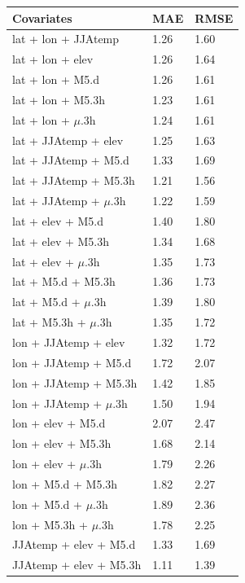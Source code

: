 \documentclass[12pt,a4paper,english]{article}
\begin{document}
\begin{singlespace}
\begin{table}
\begin{minipage}[b]{0.33\linewidth}
  \begin{tabular}{|l|l|l|}
    \hline
    \hline
    \textbf{Covariates}& \textbf{MAE} & \textbf{RMSE} \\
	\hline
	\hline
	lat + lon + JJAtemp & 1.26 & 1.60 \\
	\hline
	lat + lon + elev & 1.26 & 1.64 \\
	\hline
	lat + lon + M5.d & 1.26 & 1.61 \\
	\hline
	\rowcolor{Gray}
	lat + lon + M5.3h & 1.23 & 1.61 \\
	\hline
	\rowcolor{Gray}
	lat + lon + $\mu$.3h & 1.24 & 1.61 \\
	\hline
	\rowcolor{Gray}
	lat + JJAtemp + elev & 1.25 & 1.63 \\
	\hline
	lat + JJAtemp + M5.d & 1.33 & 1.69 \\
	\hline
	\rowcolor{Gray}	
	lat + JJAtemp + M5.3h & 1.21 & 1.56 \\
	\hline
	\rowcolor{Gray}
	lat + JJAtemp + $\mu$.3h & 1.22 & 1.59 \\
	\hline	
	lat + elev + M5.d & 1.40 & 1.80 \\
	\hline
	lat + elev + M5.3h & 1.34 & 1.68 \\
	\hline
	lat + elev + $\mu$.3h & 1.35 & 1.73 \\
	\hline
	lat + M5.d + M5.3h & 1.36 & 1.73 \\
	\hline
	lat + M5.d + $\mu$.3h & 1.39 & 1.80 \\
	\hline
	lat + M5.3h + $\mu$.3h & 1.35 & 1.72 \\
	\hline
	lon + JJAtemp + elev & 1.32 & 1.72 \\
	\hline
	lon + JJAtemp + M5.d & 1.72 & 2.07 \\
	\hline
	lon + JJAtemp + M5.3h & 1.42 & 1.85 \\
	\hline
	lon + JJAtemp + $\mu$.3h & 1.50 & 1.94 \\
	\hline
	lon + elev + M5.d & 2.07 & 2.47 \\
	\hline
	lon + elev + M5.3h & 1.68 & 2.14 \\
	\hline
	lon + elev + $\mu$.3h & 1.79 & 2.26 \\
	\hline
	lon + M5.d + M5.3h & 1.82 & 2.27 \\
	\hline
	lon + M5.d + $\mu$.3h & 1.89 & 2.36 \\
	\hline
	lon + M5.3h + $\mu$.3h & 1.78 & 2.25 \\
	\hline 
	JJAtemp + elev + M5.d & 1.33 & 1.69 \\
	\hline
	\rowcolor{DarkGray}	
	JJAtemp + elev + M5.3h & 1.11 & 1.39 \\

\end{tabular}
\end{minipage}
\end{table}
\end{singlespace}
\end{document}
